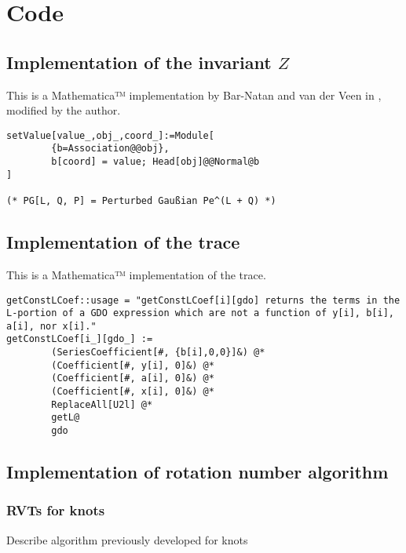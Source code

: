 \chapter{Code}
\section{Implementation of the invariant $Z$}
This is a Mathematica™ implementation by Bar-Natan and van der Veen in
\cite{BV}, modified by the author.
\begin{verbatim}
setValue[value_,obj_,coord_]:=Module[
        {b=Association@@obj},
        b[coord] = value; Head[obj]@@Normal@b
]

(* PG[L, Q, P] = Perturbed Gaußian Pe^(L + Q) *)
\end{verbatim}

\section{Implementation of the trace}

This is a Mathematica™ implementation of the trace.
\begin{verbatim}
getConstLCoef::usage = "getConstLCoef[i][gdo] returns the terms in the L-portion of a GDO expression which are not a function of y[i], b[i], a[i], nor x[i]."
getConstLCoef[i_][gdo_] :=
        (SeriesCoefficient[#, {b[i],0,0}]&) @*
        (Coefficient[#, y[i], 0]&) @*
        (Coefficient[#, a[i], 0]&) @*
        (Coefficient[#, x[i], 0]&) @*
        ReplaceAll[U2l] @*
        getL@
        gdo
\end{verbatim}

\section{Implementation of rotation number algorithm}


\subsection{\acp{RVT} for knots}
Describe algorithm previously developed for knots

